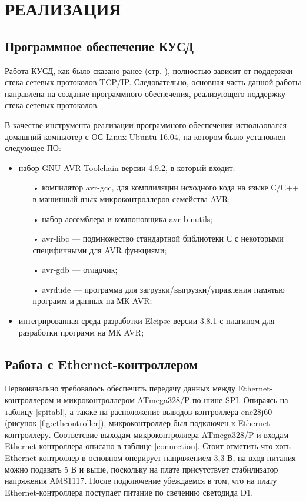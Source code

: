 \chapter{РЕАЛИЗАЦИЯ}

\section{Программное обеспечение КУСД}

Работа КУСД, как было сказано ранее (стр. \pageref{reasonofwork}), полностью зависит от поддержки стека сетевых протоколов TCP/IP. Следовательно, основная часть данной работы направлена на создание программного обеспечения, реализующего поддержку стека сетевых протоколов.

В качестве инструмента реализации программного обеспечения использовался домашний компьютер с ОС Linux Ubuntu 16.04, на котором было установлен следующее ПО:
 \begin{itemize}
	\item набор GNU AVR Toolchain версии 4.9.2, в который входит\cite{avrtoolchain}:
	\begin{itemize}
		\item[•] компилятор avr-gcc, для комплиляции исходного кода на языке С/С++ в машинный язык микроконтроллеров семейства AVR;
		\item[•] набор ассемблера и компоновщика avr-binutils;
		\item[•] avr-libc --- подмножество стандартной библиотеки С с некоторыми специфичными для AVR функциями;
		\item[•] avr-gdb --- отладчик;
		\item[•] avrdude --- программа для загрузки/выгрузки/управления памятью программ и данных на МК AVR;
	\end{itemize}
	\item интегрированная среда разработки Elcipse версии 3.8.1 с плагином для разработки программ на МК AVR;
\end{itemize}

\section{Работа с Ethernet-контроллером}

Первоначально требовалось обеспечить передачу данных между Ethernet-контроллером и микроконтроллером ATmega328/P по шине SPI. Опираясь на таблицу \ref{spitabl}, а также на расположение выводов контроллера enc28j60 (рисунок \ref{fig:ethcontroller}), микроконтроллер был подключен к Ethernet-контроллеру. Соответсвие выходам микроконтроллера ATmega328/P и входам Ethernet-контроллера описано в таблице \ref{connection}. Стоит отметить что хоть Ethernet-контроллер в основном оперирует напряжением 3,3 В, на вход питания можно подавать 5 В и выше, поскольку на плате присутствует стабилизатор напряжения AMS1117\cite{voltageregulator}. После подключение убеждаемся в том, что на плату Ethernet-контроллера поступает питание по свечению светодида D1. 

